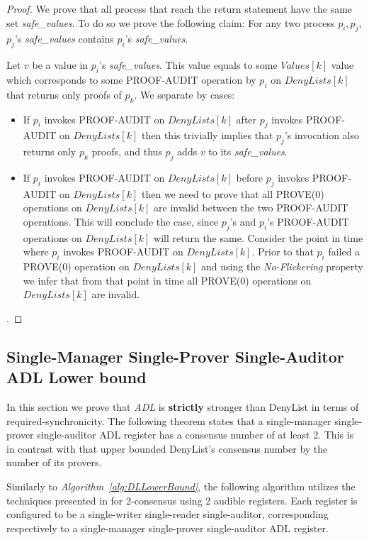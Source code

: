 \documentclass[11pt]{article}
\theoremstyle{definition}
\begin{document}
\begin{proof}
We prove that all process that reach the return statement have the same set \textit{safe\_values}. To do so we prove the following claim: For any two process $p_i,p_j$, $p_j$'s \textit{safe\_values} contains $p_i$'s \textit{safe\_values}.

Let $v$ be a value in $p_i$'s \textit{safe\_values}. This value equals to some $Values[k]$ value which corresponds to some PROOF-AUDIT operation by $p_i$ on $DenyLists[k]$ that returns only proofs of $p_k$. We separate by cases: 

\begin{itemize}
    \item If $p_i$ invokes PROOF-AUDIT on $DenyLists[k]$ after $p_j$ invokes PROOF-AUDIT on $DenyLists[k]$ then this trivially implies that $p_j$'s invocation also returns only $p_k$ proofs, and thus $p_j$ adds $v$ to its  \textit{safe\_values}. 
    \item If $p_i$ invokes PROOF-AUDIT on $DenyLists[k]$ before $p_j$ invokes PROOF-AUDIT on $DenyLists[k]$ then we need to prove that all PROVE(0) operations on $DenyLists[k]$ are invalid between the two PROOF-AUDIT operations. This will conclude the case, since  $p_j$'s and $p_i$'s PROOF-AUDIT operations on $DenyLists[k]$ will return the same. Consider the point in time where $p_i$ invokes PROOF-AUDIT on $DenyLists[k]$. Prior to that $p_i$ failed a PROVE(0) operation on  $DenyLists[k]$ and using the \textit{No-Flickering} property we infer that from that point in time all PROVE(0) operations on $DenyLists[k]$ are invalid.

\end{itemize}
. 
\end{proof}


\subsection{Single-Manager Single-Prover Single-Auditor ADL Lower bound}

In this section we prove that \textit{ADL} is \textbf{strictly} stronger than DenyList in terms of required-synchronicity. The following theorem states that a single-manager single-prover single-auditor ADL register has a consensus number of at least 2. This is in contrast with \cite{AccessControl} that upper bounded DenyList's consensus number by the number of its provers. 

Similarly to \textit{Algorithm~\ref{alg:DLLowerBound}}, the following algorithm utilizes the techniques presented in \cite{AuditableRegs} for 2-consensus using 2 audible registers. Each register is configured to be a single-writer single-reader single-auditor, corresponding respectively to a single-manager single-prover single-auditor ADL register.
\end{document}
